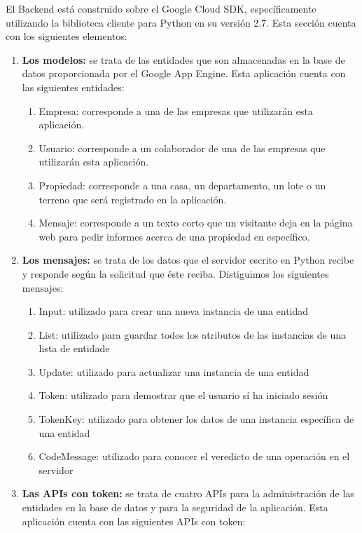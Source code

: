 \documentclass[12pt]{article}
\begin{document}
El Backend está construido sobre el Google Cloud SDK, específicamente utilizando la biblioteca cliente para Python en su versión 2.7. Esta sección cuenta con los siguientes elementos:

\begin{enumerate}
\item \textbf{Los modelos:} se trata de las entidades que son almacenadas en la base de datos proporcionada por el Google App Engine. Esta aplicación cuenta con las siguientes entidades:
  \begin{enumerate}
    \item Empresa: corresponde a una de las empresas que utilizarán esta aplicación.
    \item Usuario: corresponde a un colaborador de una de las empresas que utilizarán esta aplicación.
    \item Propiedad: corresponde a una casa, un departamento, un lote o un terreno que será registrado en la aplicación.
    \item Mensaje: corresponde a un texto corto que un visitante deja en la página web para pedir informes acerca de una propiedad en específico.
  \end{enumerate}
\item \textbf{Los mensajes:} se trata de los datos que el servidor escrito en Python recibe y responde según la solicitud que éste reciba. Distiguimos los siguientes mensajes:
    \begin{enumerate}
    \item Input: utilizado para crear una nueva instancia de una entidad
    \item List: utilizado para guardar todos los atributos de las instancias de una lista de entidade
    \item Update: utilizado para actualizar una instancia de una entidad
    \item Token: utilizado para demostrar que el usuario sí ha iniciado sesión
    \item TokenKey: utilizado para obtener los datos de una instancia específica de una entidad
    \item CodeMessage: utilizado para conocer el veredicto de una operación en el servidor
    \end{enumerate}
\item \textbf{Las APIs con token:} se trata de cuatro APIs para la administración de las entidades en la base de datos y para la seguridad de la aplicación. Esta aplicación cuenta con las siguientes APIs con token:
\begin{enumerate}

\end{enumerate}
\end{enumerate}
\end{document}
